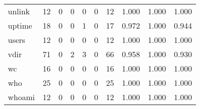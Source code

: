 \begin{longtable}{lp{1.3cm}p{1.3cm}p{1.3cm}p{1.3cm}p{1.3cm}p{1.3cm}p{1.3cm}p{1.3cm}p{1.3cm}}
unlink    &                     12 &                                             0 &                                            0 &                                           0 &                                            0 &                                         12 &                                1.000 &                                  1.000 &                                1.000 \\
uptime    &                     18 &                                             0 &                                            0 &                                           1 &                                            0 &                                         17 &                                0.972 &                                  1.000 &                                0.944 \\
users     &                     12 &                                             0 &                                            0 &                                           0 &                                            0 &                                         12 &                                1.000 &                                  1.000 &                                1.000 \\
vdir      &                     71 &                                             0 &                                            2 &                                           3 &                                            0 &                                         66 &                                0.958 &                                  1.000 &                                0.930 \\
wc        &                     16 &                                             0 &                                            0 &                                           0 &                                            0 &                                         16 &                                1.000 &                                  1.000 &                                1.000 \\
who       &                     25 &                                             0 &                                            0 &                                           0 &                                            0 &                                         25 &                                1.000 &                                  1.000 &                                1.000 \\
whoami    &                     12 &                                             0 &                                            0 &                                           0 &                                            0 &                                         12 &                                1.000 &                                  1.000 &                                1.000 \\

\end{longtable}
